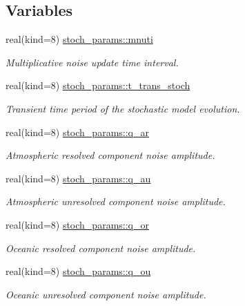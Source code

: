\subsection*{Variables}
\begin{DoxyCompactItemize}
\item 
real(kind=8) \hyperlink{namespacestoch__params_ab0b8df90daf320dc4f5810eacd7d93e7}{stoch\+\_\+params\+::mnuti}
\begin{DoxyCompactList}\small\item\em Multiplicative noise update time interval. \end{DoxyCompactList}\item 
real(kind=8) \hyperlink{namespacestoch__params_a11aa6b888c2b4005aca690fb78e2c785}{stoch\+\_\+params\+::t\+\_\+trans\+\_\+stoch}
\begin{DoxyCompactList}\small\item\em Transient time period of the stochastic model evolution. \end{DoxyCompactList}\item 
real(kind=8) \hyperlink{namespacestoch__params_a56cee7780f23cbd0cc619c5b5bb30b6c}{stoch\+\_\+params\+::q\+\_\+ar}
\begin{DoxyCompactList}\small\item\em Atmospheric resolved component noise amplitude. \end{DoxyCompactList}\item 
real(kind=8) \hyperlink{namespacestoch__params_a437fce848ee222fc34893831a54e32e9}{stoch\+\_\+params\+::q\+\_\+au}
\begin{DoxyCompactList}\small\item\em Atmospheric unresolved component noise amplitude. \end{DoxyCompactList}\item 
real(kind=8) \hyperlink{namespacestoch__params_adc17ebaeabac74e33023f9e7bb8583ec}{stoch\+\_\+params\+::q\+\_\+or}
\begin{DoxyCompactList}\small\item\em Oceanic resolved component noise amplitude. \end{DoxyCompactList}\item 
real(kind=8) \hyperlink{namespacestoch__params_a6b3308ad01c8ba1945332b05df447865}{stoch\+\_\+params\+::q\+\_\+ou}
\begin{DoxyCompactList}\small\item\em Oceanic unresolved component noise amplitude. \end{DoxyCompactList}\item 

\end{DoxyCompactItemize}
